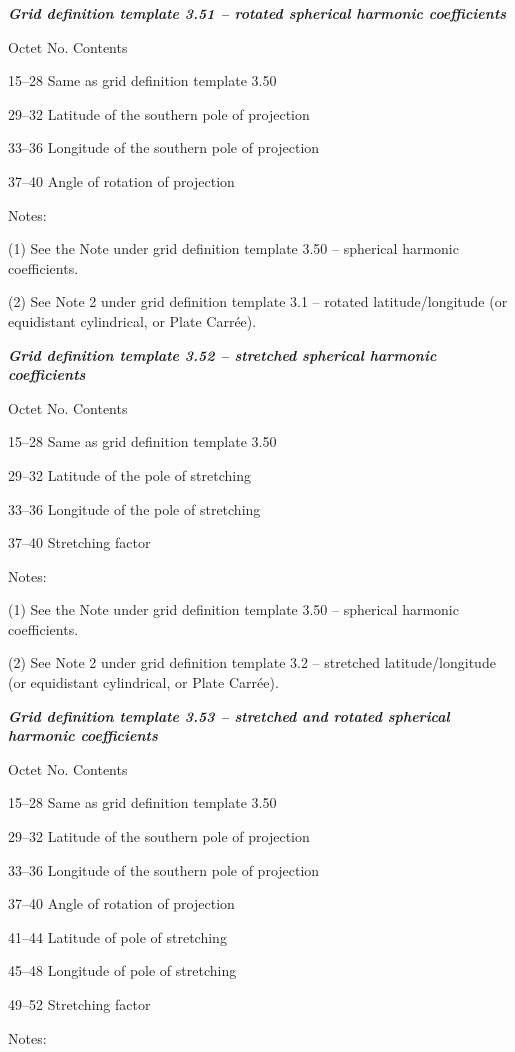 \emph{\textbf{Grid definition template 3.51 -- rotated spherical harmonic coefficients}}

Octet No. Contents

15--28 Same as grid definition template 3.50

29--32 Latitude of the southern pole of projection

33--36 Longitude of the southern pole of projection

37--40 Angle of rotation of projection

Notes:

(1) See the Note under grid definition template 3.50 -- spherical harmonic coefficients.

(2) See Note 2 under grid definition template 3.1 -- rotated latitude/longitude (or equidistant cylindrical, or Plate Carrée).

\emph{\textbf{Grid definition template 3.52 -- stretched spherical harmonic coefficients}}

Octet No. Contents

15--28 Same as grid definition template 3.50

29--32 Latitude of the pole of stretching

33--36 Longitude of the pole of stretching

37--40 Stretching factor

Notes:

(1) See the Note under grid definition template 3.50 -- spherical harmonic coefficients.

(2) See Note 2 under grid definition template 3.2 -- stretched latitude/longitude (or equidistant cylindrical, or Plate Carrée).\emph{\textbf{\\
}}

\emph{\textbf{Grid definition template 3.53 -- stretched and rotated spherical harmonic coefficients}}

Octet No. Contents

15--28 Same as grid definition template 3.50

29--32 Latitude of the southern pole of projection

33--36 Longitude of the southern pole of projection

37--40 Angle of rotation of projection

41--44 Latitude of pole of stretching

45--48 Longitude of pole of stretching

49--52 Stretching factor

Notes:

